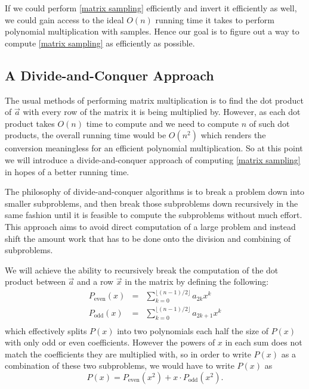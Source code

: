 \documentclass[../article.tex]{subfiles}
\begin{document}
If we could perform \eqref{matrix sampling} efficiently and invert it efficiently as well, we could gain access to the ideal $O(n)$ running time it takes to perform polynomial multiplication with samples. Hence our goal is to figure out a way to compute \eqref{matrix sampling} as efficiently as possible.

\subsection{A Divide-and-Conquer Approach}
The usual methods of performing matrix multiplication is to find the dot product of $\vec{a}$ with every row of the matrix it is being multiplied by. However, as each dot product takes $O(n)$ time to compute and we need to compute $n$ of such dot products, the overall running time would be $O(n^2)$ which renders the conversion meaningless for an efficient polynomial multiplication. So at this point we will introduce a divide-and-conquer approach of computing \eqref{matrix sampling} in hopes of a better running time.

The philosophy of divide-and-conquer algorithms is to break a problem down into smaller subproblems, and then break those subproblems down recursively in the same fashion until it is feasible to compute the subproblems without much effort. This approach aims to avoid direct computation of a large problem and instead shift the amount work that has to be done onto the division and combining of subproblems.

We will achieve the ability to recursively break the computation of the dot product between $\vec{a}$ and a row $\vec{x}$ in the matrix by defining the following:
\begin{eqnarray*}
P_{\text{even}}(x)&=&\displaystyle \sum_{k=0}^{\lfloor(n-1)/2\rfloor} a_{2k}x^k\\
P_{\text{odd}}(x)&=&\displaystyle \sum_{k=0}^{\lfloor(n-1)/2\rfloor} a_{2k+1}x^k\\
\end{eqnarray*}
which effectively splits $P(x)$ into two polynomials each half the size of $P(x)$ with only odd or even coefficients. However the powers of $x$ in each sum does not match the coefficients they are multiplied with, so in order to write $P(x)$ as a combination of these two subproblems, we would have to write $P(x)$ as
\begin{equation}\label{split}
P(x) = P_{\text{even}}(x^2)+x\cdot P_{\text{odd}}(x^2).
\end{equation}
\end{document}
